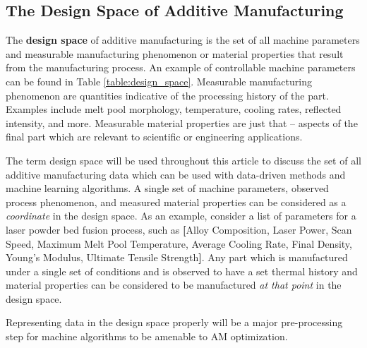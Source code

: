 \subsection{The Design Space of Additive Manufacturing}
The \textbf{design space} of additive manufacturing is the set of all machine parameters and measurable manufacturing phenomenon or material properties that result from the manufacturing process. An example of controllable machine parameters can be found in Table \ref{table:design_space}. Measurable manufacturing phenomenon are quantities indicative of the processing history of the part. Examples include melt pool morphology, temperature, cooling rates, reflected intensity, and more. Measurable material properties are just that -- aspects of the final part which are relevant to scientific or engineering applications. 

The term design space will be used throughout this article to discuss the set of all additive manufacturing data which can be used with data-driven methods and machine learning algorithms. A single set of machine parameters, observed process phenomenon, and measured material properties can be considered as a \textit{coordinate} in the design space. As an example, consider a list of parameters for a laser powder bed fusion process, such as \textbf{[}Alloy Composition, Laser Power, Scan Speed, Maximum Melt Pool Temperature, Average Cooling Rate, Final Density, Young's Modulus, Ultimate Tensile Strength\textbf{]}. Any part which is manufactured under a single set of conditions and is observed to have a set thermal history and material properties can be considered to be manufactured \textit{at that point} in the design space.

Representing data in the design space properly will be a major pre-processing step for machine algorithms to be amenable to AM optimization.

